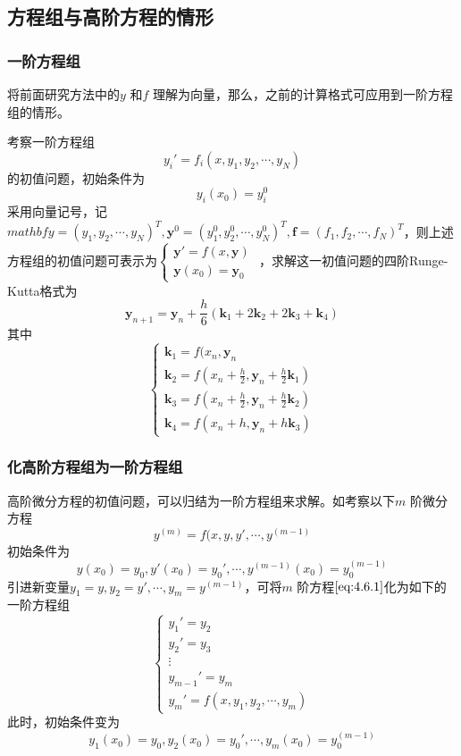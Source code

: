 \documentclass[a4paper]{article}
\begin{document}
\subsection{方程组与高阶方程的情形}
\subsubsection{一阶方程组}
将前面研究方法中的$y$ 和$f$ 理解为向量，那么，之前的计算格式可应用到一阶方程组的情形。

考察一阶方程组
\[
y_{i}' = f_i(x, y_1, y_2, \cdots, y_{N})
\] 
的初值问题，初始条件为
\[
y_{i}(x_0) = y_{i}^{0}
\] 
采用向量记号，记$mathbf{y} = (y_1, y_2, \cdots, y_{N})^{T}, \mathbf{y}^{0} = (y_1^{0}, y_2^{0}, \cdots, y_N^{0})^{T}, \mathbf{f}=(f_1, f_2,\cdots, f_N)^{T}$，则上述方程组的初值问题可表示为$\begin{cases}
	\mathbf{y}' = f(x, \mathbf{y}) \\
	\mathbf{y}(x_0) = \mathbf{y}_0
\end{cases} $
，求解这一初值问题的四阶Runge-Kutta格式为
\[
	\mathbf{y}_{n+1} = \mathbf{y}_n + \frac{h}{6} (\mathbf{k}_1 + 2 \mathbf{k}_2 + 2 \mathbf{k}_3 + \mathbf{k}_4)
\] 
其中
\[
\begin{cases}
	\mathbf{k}_1 = f(x_{n}, \mathbf{y}_n \\
	\mathbf{k}_2 = f(x_n + \frac{h}{2}, \mathbf{y}_n + \frac{h}{2} \mathbf{k}_1) \\
	\mathbf{k}_3 = f(x_n + \frac{h}{2}, \mathbf{y}_n + \frac{h}{2} \mathbf{k}_2) \\
	\mathbf{k}_4 = f(x_{n} + h, \mathbf{y}_n + h \mathbf{k}_3) 
\end{cases} 
\] 

\subsubsection{化高阶方程组为一阶方程组}
高阶微分方程的初值问题，可以归结为一阶方程组来求解。如考察以下$m$ 阶微分方程
\[
y^{(m)} = f(x, y, y', \cdots, y^{(m-1)} \tag{4.6.1} \label{eq:4.6.1} 
\] 
初始条件为
\[
y(x_0) = y_0, y'(x_{0}) = y_0', \cdots, y^{(m-1)}(x_0) = y_0^{(m-1)} \tag{4.6.2} \label{eq:4.6.2} 
\]
引进新变量$y_1 = y, y_2 = y', \cdots, y_m = y^{(m-1)}$，可将$m$ 阶方程$\ref{eq:4.6.1}$化为如下的一阶方程组
\[
	\tag{4.6.3} \label{eq:4.6.3} 
\begin{cases}
	y_1' = y_2 \\
	y_2' = y_3 \\
	\vdots \\
	y_{m-1}' = y_{m} \\
	y_m' = f(x, y_1, y_2, \cdots, y_m)
\end{cases} 
\] 
此时，初始条件变为 
\[
y_1(x_0) = y_0, y_2(x_0) = y_0',\cdots, y_m(x_0) = y_0^{(m-1)}	\tag{4.6.4} \label{eq:4.6.4}
\] 
\end{document}
